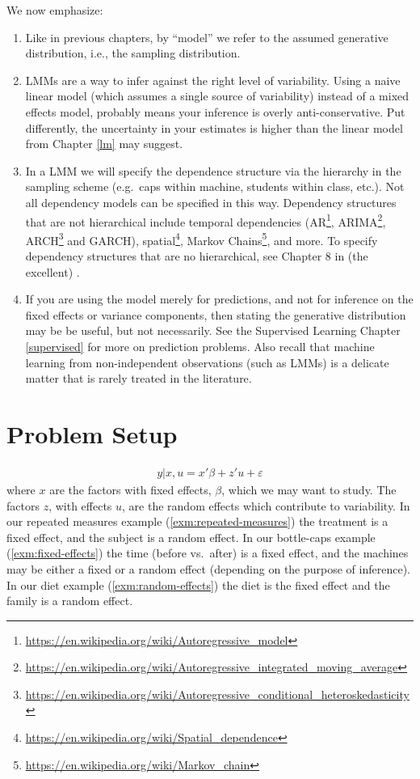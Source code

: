 \documentclass[]{book}
\renewcommand{\href}[2]{#2\footnote{\url{#1}}}
\theoremstyle{definition}
\theoremstyle{definition}
\theoremstyle{definition}
\theoremstyle{remark}
\begin{document}
We now emphasize:

\begin{enumerate}
\def\labelenumi{\arabic{enumi}.}
\item
  Like in previous chapters, by ``model'' we refer to the assumed generative distribution, i.e., the sampling distribution.
\item
  LMMs are a way to infer against the right level of variability.
  Using a naive linear model (which assumes a single source of variability) instead of a mixed effects model, probably means your inference is overly anti-conservative.
  Put differently, the uncertainty in your estimates is higher than the linear model from Chapter \ref{lm} may suggest.
\item
  In a LMM we will specify the dependence structure via the hierarchy in the sampling scheme (e.g.~caps within machine, students within class, etc.).
  Not all dependency models can be specified in this way.
  Dependency structures that are not hierarchical include temporal dependencies (\href{https://en.wikipedia.org/wiki/Autoregressive_model}{AR}, \href{https://en.wikipedia.org/wiki/Autoregressive_integrated_moving_average}{ARIMA}, \href{https://en.wikipedia.org/wiki/Autoregressive_conditional_heteroskedasticity}{ARCH} and GARCH), \href{https://en.wikipedia.org/wiki/Spatial_dependence}{spatial}, \href{https://en.wikipedia.org/wiki/Markov_chain}{Markov Chains}, and more.
  To specify dependency structures that are no hierarchical, see Chapter 8 in (the excellent) \citet{weiss2005modeling}.
\item
  If you are using the model merely for predictions, and not for inference on the fixed effects or variance components, then stating the generative distribution may be be useful, but not necessarily.
  See the Supervised Learning Chapter \ref{supervised} for more on prediction problems.
  Also recall that machine learning from non-independent observations (such as LMMs) is a delicate matter that is rarely treated in the literature.
\end{enumerate}

\hypertarget{problem-setup-2}{%
\section{Problem Setup}\label{problem-setup-2}}

\begin{align}
  y|x,u = x'\beta + z'u + \varepsilon
  \label{eq:mixed-model}  
\end{align}
where \(x\) are the factors with fixed effects, \(\beta\), which we may want to study.
The factors \(z\), with effects \(u\), are the random effects which contribute to variability.
In our repeated measures example (\ref{exm:repeated-measures}) the treatment is a fixed effect, and the subject is a random effect.
In our bottle-caps example (\ref{exm:fixed-effects}) the time (before vs.~after) is a fixed effect, and the machines may be either a fixed or a random effect (depending on the purpose of inference).
In our diet example (\ref{exm:random-effects}) the diet is the fixed effect and the family is a random effect.
\end{document}
